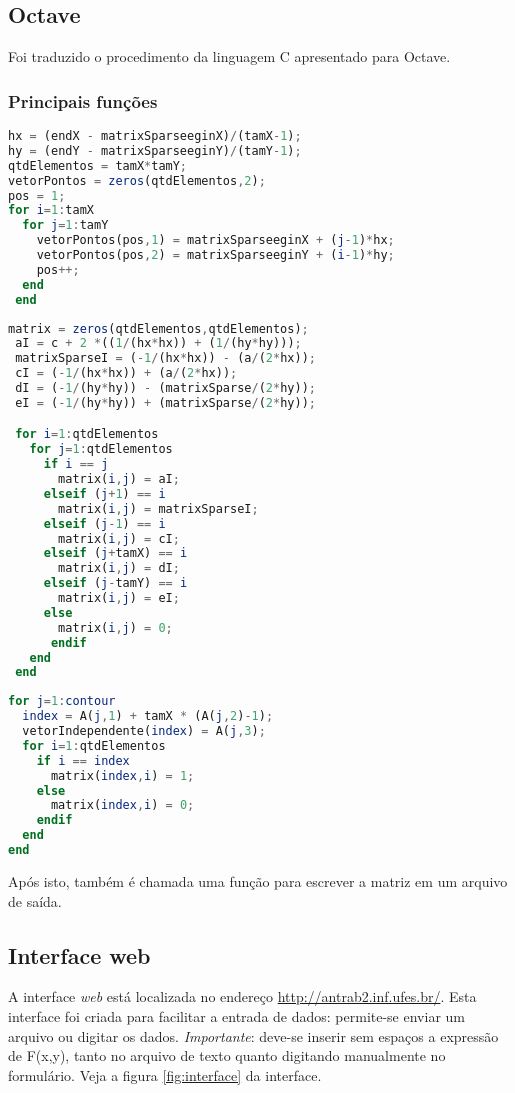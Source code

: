\documentclass[
	11pt,				%
	oneside,			%
	a4paper,			%
	english,			%
	brazil,				%
	]{article}
\begin{document}
\subsection{Octave}
Foi traduzido o procedimento da linguagem C apresentado para Octave.

\subsubsection{Principais funções}

\begin{lstlisting}[language=Octave, caption=Função Discretiza]
hx = (endX - matrixSparseeginX)/(tamX-1);
hy = (endY - matrixSparseeginY)/(tamY-1);
qtdElementos = tamX*tamY;
vetorPontos = zeros(qtdElementos,2);
pos = 1;
for i=1:tamX
  for j=1:tamY
    vetorPontos(pos,1) = matrixSparseeginX + (j-1)*hx;
    vetorPontos(pos,2) = matrixSparseeginY + (i-1)*hy;
    pos++;
  end
 end
\end{lstlisting}

\begin{lstlisting}[language=Octave, caption=Função Cria Matriz]
 matrix = zeros(qtdElementos,qtdElementos);
 aI = c + 2 *((1/(hx*hx)) + (1/(hy*hy)));
 matrixSparseI = (-1/(hx*hx)) - (a/(2*hx));
 cI = (-1/(hx*hx)) + (a/(2*hx));
 dI = (-1/(hy*hy)) - (matrixSparse/(2*hy));
 eI = (-1/(hy*hy)) + (matrixSparse/(2*hy));

 for i=1:qtdElementos
   for j=1:qtdElementos
     if i == j
       matrix(i,j) = aI;
     elseif (j+1) == i
       matrix(i,j) = matrixSparseI;
     elseif (j-1) == i
       matrix(i,j) = cI;
     elseif (j+tamX) == i
       matrix(i,j) = dI;
     elseif (j-tamY) == i
       matrix(i,j) = eI;
     else
       matrix(i,j) = 0;
      endif
   end
 end
\end{lstlisting}

\begin{lstlisting}[language=Octave, caption=Função Insere Contorno]
for j=1:contour
  index = A(j,1) + tamX * (A(j,2)-1);
  vetorIndependente(index) = A(j,3);
  for i=1:qtdElementos
    if i == index
      matrix(index,i) = 1;
    else
      matrix(index,i) = 0;
    endif
  end
end
\end{lstlisting}

Após isto, também é chamada uma função para escrever a matriz em um arquivo de saída.

\subsection{Interface web}
A interface \textit{web} está localizada no endereço \url{http://antrab2.inf.ufes.br/}. Esta interface foi criada para facilitar a entrada de dados: permite-se enviar um arquivo ou digitar os dados. \textit{Importante}: deve-se inserir sem espaços a expressão de F(x,y), tanto no arquivo de texto quanto digitando manualmente no formulário. Veja a figura \ref{fig:interface} da interface.
\end{document}
